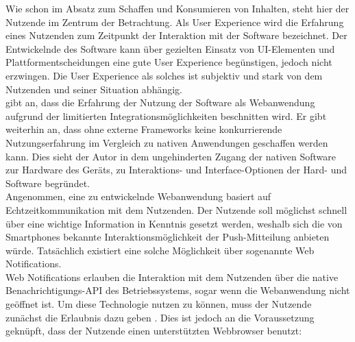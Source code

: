 \documentclass[a4paper]{scrartcl}
\begin{document}
Wie schon im Absatz zum Schaffen und Konsumieren von Inhalten, steht hier der Nutzende im Zentrum der Betrachtung. Als User Experience wird die Erfahrung eines Nutzenden zum Zeitpunkt der Interaktion mit der Software bezeichnet. Der Entwickelnde des Software kann über gezielten Einsatz von UI-Elementen und Plattformentscheidungen eine gute User Experience begünstigen, jedoch nicht erzwingen. Die User Experience als solches ist subjektiv und stark von dem Nutzenden und seiner Situation abhängig. \\
\textcite[28]{Jobe} gibt an, dass die Erfahrung der Nutzung der Software als Webanwendung aufgrund der limitierten Integrationsmöglichkeiten beschnitten wird. Er gibt weiterhin an, dass ohne externe Frameworks keine konkurrierende Nutzungserfahrung im Vergleich zu nativen Anwendungen geschaffen werden kann. Dies sieht der Autor in dem ungehinderten Zugang der nativen Software zur Hardware des Geräts, zu Interaktions- und Interface-Optionen der Hard- und Software begründet. \\

Angenommen, eine zu entwickelnde Webanwendung basiert auf Echtzeitkommunikation mit dem Nutzenden. Der Nutzende soll möglichst schnell über eine wichtige Information in Kenntnis gesetzt werden, weshalb sich die von Smartphones bekannte Interaktionsmöglichkeit der Push-Mitteilung anbieten würde. Tatsächlich existiert eine solche Möglichkeit über sogenannte Web Notifications. \\
Web Notifications erlauben die Interaktion mit dem Nutzenden über die native Benachrichtigungs-API des Betriebssystems, sogar wenn die Webanwendung nicht geöffnet ist. Um diese Technologie nutzen zu können, muss der Nutzende zunächst die Erlaubnis dazu geben \autocite{Notifications_API}. Dies ist jedoch an die Voraussetzung geknüpft, dass der Nutzende einen unterstützten Webbrowser benutzt:
\end{document}
